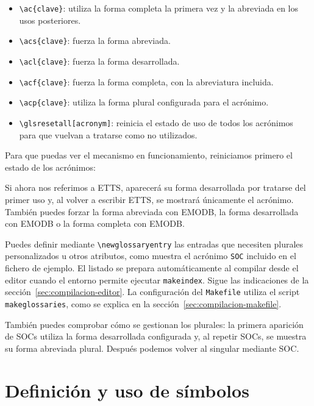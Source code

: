 \begin{itemize}
  \item \texttt{\textbackslash{}ac\{clave\}}: utiliza la forma completa la primera vez y la abreviada en los usos posteriores.
  \item \texttt{\textbackslash{}acs\{clave\}}: fuerza la forma abreviada.
  \item \texttt{\textbackslash{}acl\{clave\}}: fuerza la forma desarrollada.
  \item \texttt{\textbackslash{}acf\{clave\}}: fuerza la forma completa, con la abreviatura incluida.
  \item \texttt{\textbackslash{}acp\{clave\}}: utiliza la forma plural configurada para el acrónimo.
  \item \texttt{\textbackslash{}glsresetall[acronym]}: reinicia el estado de uso de todos los acrónimos para que vuelvan a tratarse como no utilizados.
\end{itemize}

Para que puedas ver el mecanismo en funcionamiento, reiniciamos primero el estado de los acrónimos:

\glsresetall[acronym]

Si ahora nos referimos a \ac{ETTS}, aparecerá su forma desarrollada por tratarse del primer uso y, al volver a escribir \ac{ETTS}, se mostrará únicamente el acrónimo. También puedes forzar la forma abreviada con \acs{EMODB}, la forma desarrollada con \acl{EMODB} o la forma completa con \acf{EMODB}.

Puedes definir mediante \texttt{\textbackslash{}newglossaryentry} las entradas que necesiten plurales personalizados u otros atributos, como muestra el acrónimo \texttt{SOC} incluido en el fichero de ejemplo. El listado se prepara automáticamente al compilar desde el editor cuando el entorno permite ejecutar \texttt{makeindex}. Sigue las indicaciones de la sección~\ref{sec:compilacion-editor}. La configuración del \texttt{Makefile} utiliza el script \texttt{makeglossaries}, como se explica en la sección~\ref{sec:compilacion-makefile}.

También puedes comprobar cómo se gestionan los plurales: la primera aparición de \acp{SOC} utiliza la forma desarrollada configurada y, al repetir \acp{SOC}, se muestra su forma abreviada plural. Después podemos volver al singular mediante \ac{SOC}.

\section{Definición y uso de símbolos}
\label{sec:simbolos}

